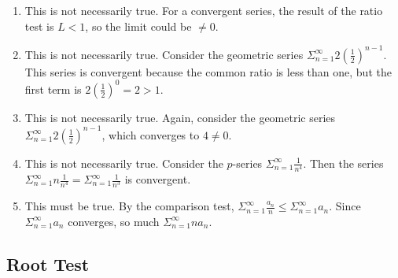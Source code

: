 \begin{Answer}[ref=label2]
\begin{enumerate}
\item This is not necessarily true. For a convergent series, the result of the ratio test is $L < 1$, so the limit could be $\neq 0$. 
\item This is not necessarily true. Consider the geometric series $\Sigma_{n=1}^\infty 2(\frac{1}{2})^{n-1}$. This series is convergent because the common ratio is less than one, but the first term is $2(\frac{1}{2})^0 = 2 > 1$. 
\item This is not necessarily true. Again, consider the geometric series $\Sigma_{n=1}^\infty 2(\frac{1}{2})^{n-1}$, which converges to $4 \neq 0$. 
\item This is not necessarily true. Consider the $p$-series $\Sigma_{n=1}^\infty \frac{1}{n^4}$. Then the series $\Sigma_{n=1}^\infty n \frac{1}{n^4} = \Sigma_{n=1}^\infty \frac{1}{n^3}$ is convergent. 
\item This must be true. By the comparison test, $\Sigma_{n=1}^\infty \frac{a_n}{n} \leq \Sigma_{n = 1}^\infty a_n$. Since $\Sigma_{n = 1}^\infty a_n$ converges, so much $\Sigma_{n = 1}^\infty na_n$. 
\end{enumerate}
\end{Answer}

\subsection{Root Test}






